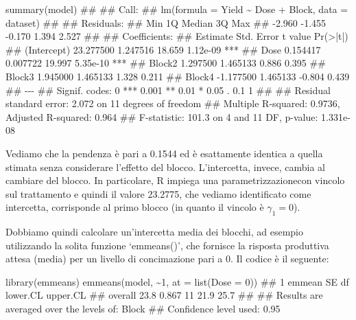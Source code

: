 \documentclass[a4paper,12pt,oneside]{book}
\newenvironment{Shaded}{\begin{snugshade}}{\end{snugshade}}
\newcommand{\DecValTok}[1]{#1}
\newcommand{\SpecialCharTok}[1]{#1}
\newcommand{\DocumentationTok}[1]{#1}
\newcommand{\FunctionTok}[1]{#1}
\newcommand{\AttributeTok}[1]{#1}
\newcommand{\NormalTok}[1]{#1}
\begin{document}
\begin{Shaded}
\begin{Highlighting}[]
\FunctionTok{summary}\NormalTok{(model)}
\DocumentationTok{\#\# }
\DocumentationTok{\#\# Call:}
\DocumentationTok{\#\# lm(formula = Yield \textasciitilde{} Dose + Block, data = dataset)}
\DocumentationTok{\#\# }
\DocumentationTok{\#\# Residuals:}
\DocumentationTok{\#\#    Min     1Q Median     3Q    Max }
\DocumentationTok{\#\# {-}2.960 {-}1.455 {-}0.170  1.394  2.527 }
\DocumentationTok{\#\# }
\DocumentationTok{\#\# Coefficients:}
\DocumentationTok{\#\#              Estimate Std. Error t value Pr(\textgreater{}|t|)    }
\DocumentationTok{\#\# (Intercept) 23.277500   1.247516  18.659 1.12e{-}09 ***}
\DocumentationTok{\#\# Dose         0.154417   0.007722  19.997 5.35e{-}10 ***}
\DocumentationTok{\#\# Block2       1.297500   1.465133   0.886    0.395    }
\DocumentationTok{\#\# Block3       1.945000   1.465133   1.328    0.211    }
\DocumentationTok{\#\# Block4      {-}1.177500   1.465133  {-}0.804    0.439    }
\DocumentationTok{\#\# {-}{-}{-}}
\DocumentationTok{\#\# Signif. codes:  0 \textquotesingle{}***\textquotesingle{} 0.001 \textquotesingle{}**\textquotesingle{} 0.01 \textquotesingle{}*\textquotesingle{} 0.05 \textquotesingle{}.\textquotesingle{} 0.1 \textquotesingle{} \textquotesingle{} 1}
\DocumentationTok{\#\# }
\DocumentationTok{\#\# Residual standard error: 2.072 on 11 degrees of freedom}
\DocumentationTok{\#\# Multiple R{-}squared:  0.9736, Adjusted R{-}squared:  0.964 }
\DocumentationTok{\#\# F{-}statistic: 101.3 on 4 and 11 DF,  p{-}value: 1.331e{-}08}
\end{Highlighting}
\end{Shaded}

Vediamo che la pendenza è pari a 0.1544 ed è esattamente identica a quella stimata senza considerare l'effetto del blocco. L'intercetta, invece, cambia al cambiare del blocco. In particolare, R impiega una parametrizzazionecon vincolo sul trattamento e quindi il valore 23.2775, che vediamo identificato come intercetta, corrisponde al primo blocco (in quanto il vincolo è \(\gamma_1 = 0\)).

Dobbiamo quindi calcolare un'intercetta media dei blocchi, ad esempio utilizzando la solita funzione `emmeans()', che fornisce la risposta produttiva attesa (media) per un livello di concimazione pari a 0. Il codice è il seguente:

\begin{Shaded}
\begin{Highlighting}[]
\FunctionTok{library}\NormalTok{(emmeans)}
\FunctionTok{emmeans}\NormalTok{(model, }\SpecialCharTok{\textasciitilde{}}\DecValTok{1}\NormalTok{, }\AttributeTok{at =} \FunctionTok{list}\NormalTok{(}\AttributeTok{Dose =} \DecValTok{0}\NormalTok{))}
\DocumentationTok{\#\#  1       emmean    SE df lower.CL upper.CL}
\DocumentationTok{\#\#  overall   23.8 0.867 11     21.9     25.7}
\DocumentationTok{\#\# }
\DocumentationTok{\#\# Results are averaged over the levels of: Block }
\DocumentationTok{\#\# Confidence level used: 0.95}
\end{Highlighting}
\end{Shaded}
\end{document}
